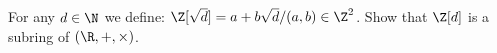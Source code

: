 For any $d \in \N$ we define: $\Z[\sqrt{d}] = {a + b\sqrt{d} / (a,b) \in \Z^2}$.
Show that $\Z[d]$ is a subring of $(\R, +, \times)$.